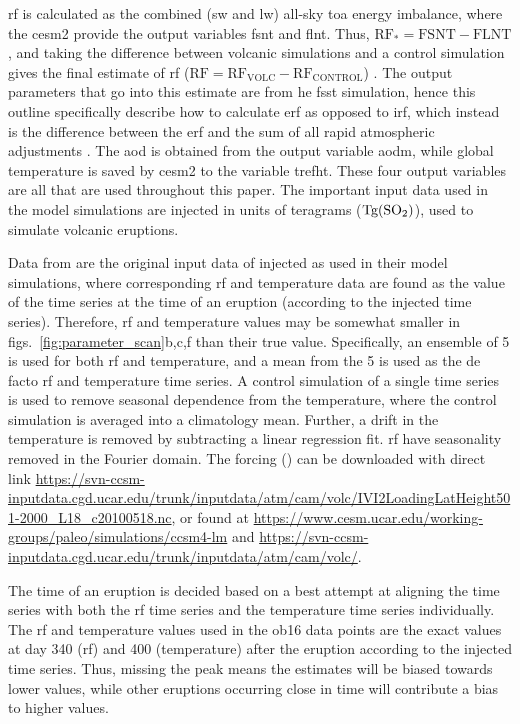 \documentclass{ametsocV6.1}
\newcommand{\iso}[1][i]{{#1}njected \ce{SO2}}
\begin{document}
\gls{rf} is calculated as the combined (\gls{sw} and \gls{lw}) all-sky \gls{toa} energy
imbalance, where the \gls{cesm2} provide the output variables \gls{fsnt} and \gls{flnt}.
Thus, \(\mathrm{RF_*}= \mathrm{FSNT} - \mathrm{FLNT}\), and taking the difference
between volcanic simulations and a control simulation gives the final estimate of
\gls{rf} (\(\mathrm{RF}=\mathrm{RF_{VOLC}}-\mathrm{RF_{CONTROL}}\))
\citep{marshall2020}. The output parameters that go into this estimate are from he
\gls{fsst} simulation, hence this outline specifically describe how to calculate
\gls{erf} as opposed to \gls{irf}, which instead is the difference between the \gls{erf}
and the sum of all rapid atmospheric adjustments \citep{marshall2020,smith2018}. The
\gls{aod} is obtained from the output variable \gls{aodm}, while global temperature is
saved by \gls{cesm2} to the variable \gls{trefht}. These four output variables are all
that are used throughout this paper. The important input data used in the model
simulations are \iso{} in units of teragrams (\(\si{\tera\gram(\ce{SO2})}\)), used to
simulate volcanic eruptions.

\appendix[B]

\label{ap:ob16}

Data from \citet{ottobliesner2016} are the original input data of \iso{} as used in
their model simulations, where corresponding \gls{rf} and temperature data are found as
the value of the time series at the time of an eruption (according to the \iso{} time
series). Therefore, \gls{rf} and temperature values may be somewhat smaller in
figs.~\ref{fig:parameter_scan}b,c,f than their true value. Specifically, an ensemble of
5 is used for both \gls{rf} and temperature, and a mean from the 5 is used as the de
facto \gls{rf} and temperature time series. A control simulation of a single time series
is used to remove seasonal dependence from the temperature, where the control simulation
is averaged into a climatology mean. Further, a drift in the temperature is removed by
subtracting a linear regression fit. \gls{rf} have seasonality removed in the Fourier
domain. The forcing () can be downloaded with direct link
\url{https://svn-ccsm-inputdata.cgd.ucar.edu/trunk/inputdata/atm/cam/volc/IVI2LoadingLatHeight501-2000_L18_c20100518.nc},
or found at \url{https://www.cesm.ucar.edu/working-groups/paleo/simulations/ccsm4-lm}
and \url{https://svn-ccsm-inputdata.cgd.ucar.edu/trunk/inputdata/atm/cam/volc/}.

The time of an eruption is decided based on a best attempt at aligning the  time
series with both the \gls{rf} time series and the temperature time series individually.
The \gls{rf} and temperature values used in the \gls{ob16} data points are the exact
values at day 340 (\gls{rf}) and 400 (temperature) after the eruption according to the
\iso{} time series. Thus, missing the peak means the estimates will be biased towards
lower values, while other eruptions occurring close in time will contribute a bias to
higher values.
\end{document}
